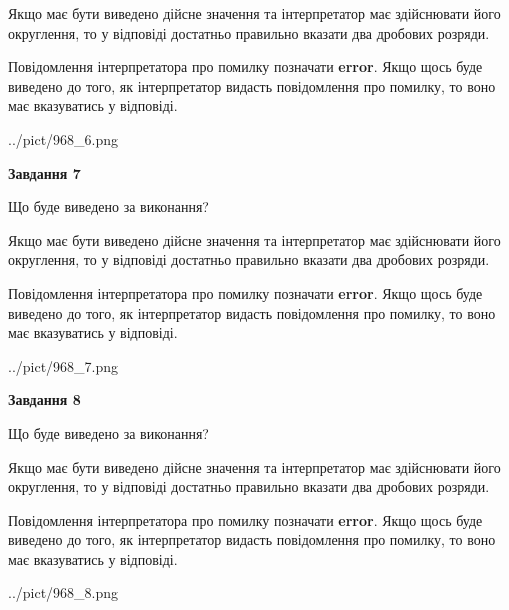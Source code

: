 \documentclass[12pt, ukrainian]{article}
\begin{document}
{\begin {Large}
Якщо має бути виведено дійсне значення та інтерпретатор має здійснювати його округлення, 
то у відповіді достатньо правильно вказати два дробових розряди.

Повідомлення інтерпретатора про помилку позначати \textbf{error}.
Якщо щось буде виведено до того, як інтерпретатор видасть повідомлення про помилку, 
то воно має вказуватись у відповіді. \par

\begin{center}
	{../pict/968_6.png}
\end{center}
\newpage

{\begin {center}\textbf{Завдання 7}\end {center}}\par
Що буде виведено за виконання? \par

Якщо має бути виведено дійсне значення та інтерпретатор має здійснювати його округлення, 
то у відповіді достатньо правильно вказати два дробових розряди.

Повідомлення інтерпретатора про помилку позначати \textbf{error}.
Якщо щось буде виведено до того, як інтерпретатор видасть повідомлення про помилку, 
то воно має вказуватись у відповіді. \par

\begin{center}
	{../pict/968_7.png}
\end{center}
\newpage

{\begin {center}\textbf{Завдання 8}\end {center}}\par
Що буде виведено за виконання? \par

Якщо має бути виведено дійсне значення та інтерпретатор має здійснювати його округлення, 
то у відповіді достатньо правильно вказати два дробових розряди.

Повідомлення інтерпретатора про помилку позначати \textbf{error}.
Якщо щось буде виведено до того, як інтерпретатор видасть повідомлення про помилку, 
то воно має вказуватись у відповіді. \par

\begin{center}
	{../pict/968_8.png}
\end{center}
\newpage


\end{Large}}
\end{document}
